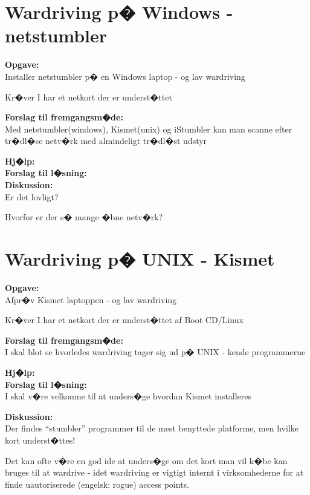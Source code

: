 \documentclass[a4paper,11pt,notitlepage]{oevelser}
\begin{document}
\chapter{Wardriving p� Windows - netstumbler}
\label{ex:wardriving-windows}

{\bfseries Opgave:}\\
Installer netstumbler p� en Windows laptop - og lav wardriving

Kr�ver I har et netkort der er underst�ttet

{\bfseries Forslag til fremgangsm�de:}\\
Med netstumbler(windows), Kismet(unix) og iStumbler kan man
scanne efter tr�dl�se netv�rk med almindeligt tr�dl�st udstyr

{\bfseries Hj�lp:}\\

{\bfseries Forslag til l�sning:}\\

{\bfseries Diskussion:}\\
Er det lovligt?

Hvorfor er der s� mange �bne netv�rk?


\chapter{Wardriving p� UNIX - Kismet}
\label{ex:wardriving-kismet}

{\bfseries Opgave:}\\
Afpr�v Kismet laptoppen - og lav wardriving

Kr�ver I har et netkort der er underst�ttet af Boot CD/Linux

{\bfseries Forslag til fremgangsm�de:}\\
I skal blot se hvorledes wardriving tager sig ud p� UNIX - kende
programmerne

{\bfseries Hj�lp:}\\

{\bfseries Forslag til l�sning:}\\
I skal v�re velkomne til at unders�ge hvordan Kismet installeres

{\bfseries Diskussion:}\\
Der findes ``stumbler'' programmer til de mest benyttede platforme,
men hvilke kort underst�ttes!

Det kan ofte v�re en god ide at unders�ge om det kort man vil k�be kan
bruges til at wardrive - idet wardriving er vigtigt internt i
virksomhederne for at finde uautoriserede (engelsk: rogue) access
points.
\end{document}
